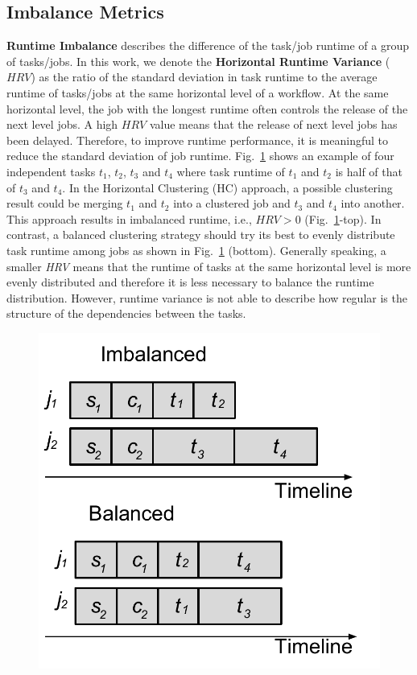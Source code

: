 \subsection{Imbalance Metrics}


\textbf{Runtime Imbalance} describes the difference of the task/job runtime of a group of tasks/jobs. In this work, we denote the \textbf{Horizontal Runtime Variance} ($HRV$) as the ratio of the standard deviation in task runtime to the average runtime of tasks/jobs at the same horizontal level of a workflow. At the same horizontal level, the job with the longest runtime often controls the release of the next level jobs. A high $HRV$ value means that the release of next level jobs has been delayed.
Therefore, to improve runtime performance, it is meaningful to reduce the standard deviation of job runtime. Fig.~\ref{fig:imbalance_rv} shows an example of four independent tasks $t_1$, $t_2$, $t_3$ and $t_4$ where task runtime of $t_1$ and $t_2$ is half of that of $t_3$ and $t_4$. In the Horizontal Clustering (HC) approach, a possible clustering result could be merging $t_1$ and $t_2$ into a clustered job and $t_3$ and $t_4$ into another. This approach results in imbalanced runtime, i.e., $HRV > 0$ (Fig.~\ref{fig:imbalance_rv}-top). In contrast, a balanced clustering strategy should try its best to evenly distribute task runtime among jobs as shown in Fig.~\ref{fig:imbalance_rv} (bottom). Generally speaking, a smaller \emph{HRV} means that the runtime of tasks at the same horizontal level is more evenly distributed and therefore it is less necessary to balance the runtime distribution. However, runtime variance is not able to describe how regular is the structure of the dependencies between the tasks.

\begin{figure}[htb]
	\centering
	\includegraphics[width=0.6\linewidth]{figures/imbalance/rv.pdf}
	\label{fig:imbalance_rv}
\end{figure}




